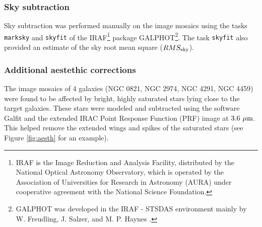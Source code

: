 \documentclass[preprint2]{emulateapj}
\begin{document}
\subsubsection{Sky subtraction}
Sky subtraction was performed manually on the image mosaics using the tasks {\tt marksky} and {\tt skyfit} 
of the IRAF\footnote{IRAF is the Image Reduction and Analysis Facility, 
distributed by the National Optical Astronomy Observatory, 
which is operated by the Association of Universities for Research in Astronomy (AURA) 
under cooperative agreement with the National Science Foundation.} 
package GALPHOT\footnote{GALPHOT was developed in the IRAF - STSDAS environment mainly by 
W. Freudling, J. Salzer, and M. P. Haynes \citep{haynes1999galphot}.}.
The task {\tt skyfit} also provided an estimate of the sky root mean square ($RMS_{\rm sky}$).

\subsubsection{Additional aestethic corrections}
The image mosaics of 4 galaxies (NGC 0821, NGC 2974, NGC 4291, NGC 4459) were found to be affected 
by bright, highly saturated stars lying close to the target galaxies.
These stars were modeled and subtracted using the software Galfit \citep{peng2010} 
and the extended IRAC Point Response Function (PRF) image at $3.6~\rm \mu m$.
This helped remove the extended wings and spikes of the saturated stars 
(see Figure \ref{fig:aesth} for an example).
\end{document}

